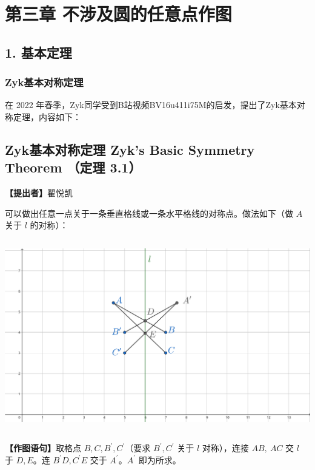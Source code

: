 \documentclass[UTF8]{article}
\author{}
\date{}
\begin{document}
\section{第三章
不涉及圆的任意点作图}


\subsection{1. 基本定理}

\hypertarget{zykux57faux672cux5bf9ux79f0ux5b9aux7406}{%
\subsubsection{Zyk基本对称定理}\label{zykux57faux672cux5bf9ux79f0ux5b9aux7406}}

在 2022
年春季，Zyk同学受到B站视频BV16u411i75M的启发，提出了Zyk基本对称定理，内容如下：

\hypertarget{zykux57faux672cux5bf9ux79f0ux5b9aux7406-zyks-basic-symmetry-theorem-ux5b9aux7406-3.1}{%
\subsection{Zyk基本对称定理 Zyk's Basic Symmetry Theorem （定理
3.1）}\label{zykux57faux672cux5bf9ux79f0ux5b9aux7406-zyks-basic-symmetry-theorem-ux5b9aux7406-3.1}}

\textbf{【提出者】}翟悦凯

可以做出任意一点关于一条垂直格线或一条水平格线的对称点。做法如下（做
\(A\) 关于 \(l\) 的对称）：

\includegraphics[width=5.76806in,height=3.27847in]{media/image1.png}

\textbf{【作图语句】}取格点 \(B,C,B^{'},C^{'}\)（要求 \(B^{'},C^{'}\)
关于 \(l\) 对称），连接 \(AB,\ AC\) 交 \(l\) 于 \(D,E\)。连
\(B^{'}D,C^{'}E\) 交于 \(A^{'}\)。\(A^{'}\) 即为所求。
\end{document}
